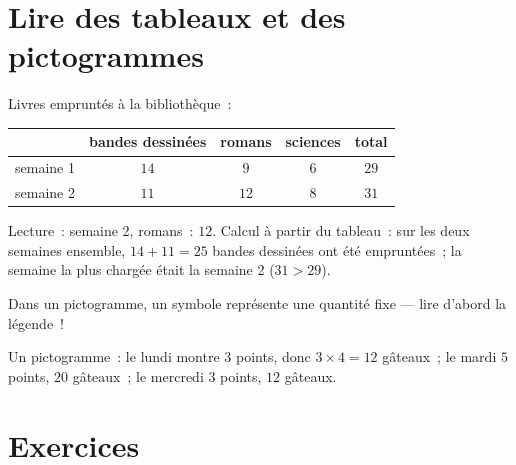 \section{Lire des tableaux et des pictogrammes}

\begin{example}[Un tableau]\label{ex:g3:problems:table}
Livres empruntés à la bibliothèque~:
\begin{center}
\renewcommand{\arraystretch}{1.3}
\begin{tabular}{l|cccc}
 & bandes dessinées & romans & sciences & total \\
\hline
semaine 1 & $14$ & $9$ & $6$ & $29$ \\
semaine 2 & $11$ & $12$ & $8$ & $31$ \\
\end{tabular}
\end{center}
Lecture~: semaine 2, romans~: $12$. Calcul à partir du tableau~:
sur les deux semaines ensemble, $14 + 11 = 25$ bandes dessinées ont
été empruntées~; la semaine la plus chargée était la
semaine 2 ($31 > 29$).
\end{example}

\begin{example}[Un pictogramme]\label{ex:g3:problems:pictogram}
Dans un pictogramme, un symbole représente une quantité fixe ---
lire d'abord la légende~!

\begin{omfigure}

{\small Un pictogramme~: le lundi montre $3$ points, donc
$3 \times 4 = 12$ gâteaux~; le mardi $5$ points, $20$ gâteaux~;
le mercredi $3$ points, $12$ gâteaux.}
\end{omfigure}
\end{example}

\section{Exercices}

